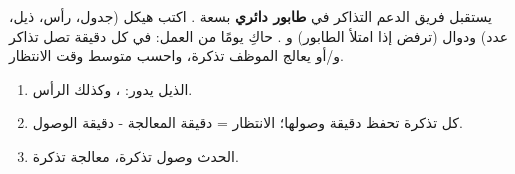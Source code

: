 \begin{statement}
يستقبل فريق الدعم التذاكر في \textbf{طابور دائري} بسعة . اكتب هيكل  (جدول، رأس، ذيل، عدد) ودوال  (ترفض إذا امتلأ الطابور) و . حاكِ يومًا من العمل: في كل دقيقة تصل تذاكر و/أو يعالج الموظف تذكرة، واحسب متوسط وقت الانتظار.
\end{statement}
\begin{stepsbox}\begin{enumerate}
\item الذيل يدور: ، وكذلك الرأس.
\item كل تذكرة تحفظ دقيقة وصولها؛ الانتظار = دقيقة المعالجة - دقيقة الوصول.
\item الحدث \code{+} وصول تذكرة، \code{-} معالجة تذكرة.
\end{enumerate}\end{stepsbox}

